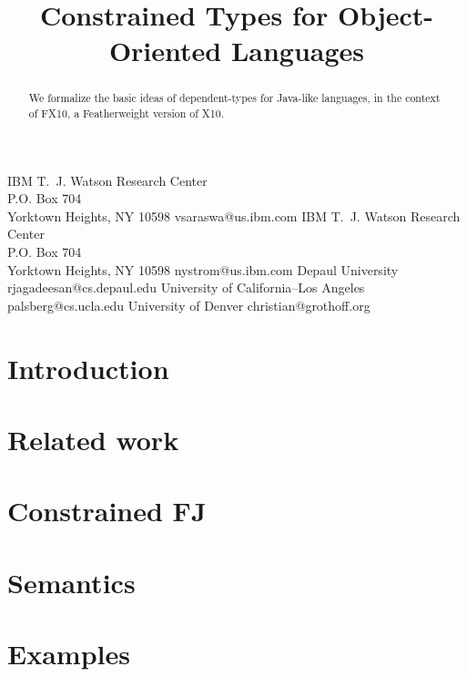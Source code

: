 \documentclass[nocopyrightspace,preprint,9pt]{sigplanconf}
\newcommand\Xten{{X10}}
\newcommand\FXten{{FX10}}
\begin{document}
\title{Constrained Types for Object-Oriented Languages}
  {IBM T.~J. Watson Research Center \\
   P.O. Box 704 \\
   Yorktown Heights, NY 10598}
  {vsaraswa@us.ibm.com}
  {IBM T.~J. Watson Research Center \\
   P.O. Box 704 \\
   Yorktown Heights, NY 10598}
  {nystrom@us.ibm.com}
  {Depaul University}
  {rjagadeesan@cs.depaul.edu}
  {University of California--Los Angeles}
  {palsberg@cs.ucla.edu}
  {University of Denver}
  {christian@grothoff.org}

\maketitle


\begin{abstract}
We formalize the basic ideas of dependent-types for Java-like
languages, in the context of \FXten, a Featherweight version of \Xten{}.
\end{abstract}

\section{Introduction}
\label{sec:intro}


\section{Related work}
\label{sec:related}


\section{Constrained FJ}
\label{sec:lang}


\section{Semantics}
\label{sec:semantics}


\section{Examples}
\label{sec:examples}

\end{document}
